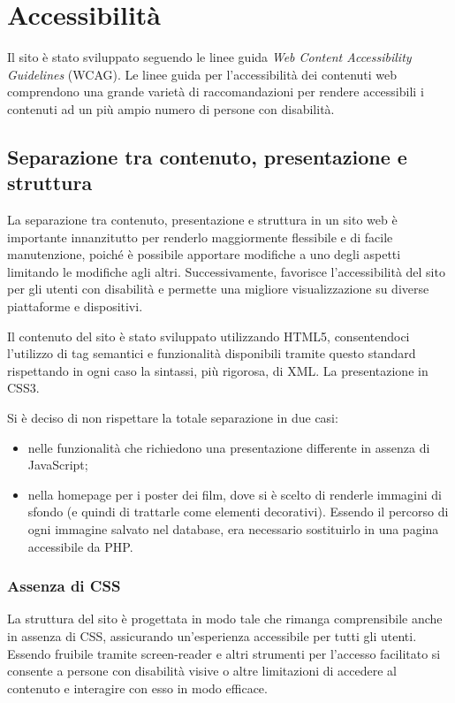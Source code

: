 \section{Accessibilità}
Il sito è stato sviluppato seguendo le linee guida \textit{Web Content Accessibility Guidelines} (WCAG).
Le linee guida per l'accessibilità dei contenuti web comprendono una grande varietà di raccomandazioni per rendere accessibili i contenuti ad un più ampio numero di persone con disabilità.

\subsection{Separazione tra contenuto, presentazione e struttura}
La separazione tra contenuto, presentazione e struttura in un sito web è importante innanzitutto per renderlo maggiormente flessibile e di facile manutenzione, poiché è possibile apportare modifiche a uno degli aspetti limitando le modifiche agli altri. Successivamente, favorisce l'accessibilità del sito per gli utenti con disabilità e permette una migliore visualizzazione su diverse piattaforme e dispositivi.

Il contenuto del sito è stato sviluppato utilizzando HTML5, consentendoci l’utilizzo di tag semantici e funzionalità disponibili tramite questo standard rispettando in ogni caso la sintassi, più rigorosa, di XML. La presentazione in CSS3.

Si è deciso di non rispettare la totale separazione in due casi:
\begin{itemize}
    \item nelle funzionalità che richiedono una presentazione differente in assenza di\\JavaScript;
    \item nella homepage per i poster dei film, dove si è scelto di renderle immagini di sfondo (e quindi di trattarle come elementi decorativi). Essendo il percorso di ogni immagine salvato nel database, era necessario sostituirlo in una pagina accessibile da PHP.
\end{itemize}


\subsubsection{Assenza di CSS}
La struttura del sito è progettata in modo tale che rimanga comprensibile anche in assenza di CSS, assicurando un'esperienza accessibile per tutti gli utenti. Essendo fruibile tramite screen-reader e altri strumenti per l'accesso facilitato si consente a persone con disabilità visive o altre limitazioni di accedere al contenuto e interagire con esso in modo efficace.

